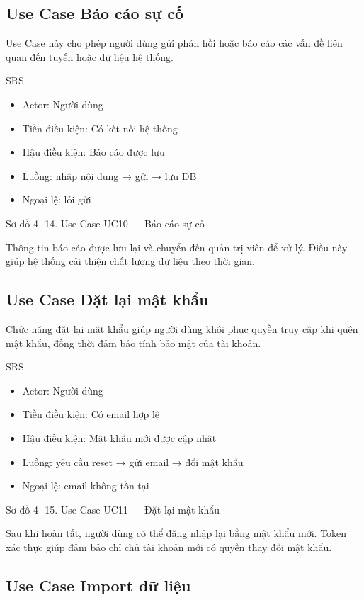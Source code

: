 \documentclass[13pt,a4paper]{report}
\begin{document}
\subsection{Use Case Báo cáo sự cố}

Use Case này cho phép người dùng gửi phản hồi hoặc báo cáo các vấn đề liên quan đến tuyến hoặc dữ liệu hệ thống.

SRS

\begin{itemize}
    \item Actor: Người dùng
    \item Tiền điều kiện: Có kết nối hệ thống
    \item Hậu điều kiện: Báo cáo được lưu
    \item Luồng: nhập nội dung → gửi → lưu DB
    \item Ngoại lệ: lỗi gửi
\end{itemize}

Sơ đồ 4- 14. Use Case UC10 — Báo cáo sự cố

Thông tin báo cáo được lưu lại và chuyển đến quản trị viên để xử lý. Điều này giúp hệ thống cải thiện chất lượng dữ liệu theo thời gian.

\subsection{Use Case Đặt lại mật khẩu}

Chức năng đặt lại mật khẩu giúp người dùng khôi phục quyền truy cập khi quên mật khẩu, đồng thời đảm bảo tính bảo mật của tài khoản.

SRS

\begin{itemize}
    \item Actor: Người dùng
    \item Tiền điều kiện: Có email hợp lệ
    \item Hậu điều kiện: Mật khẩu mới được cập nhật
    \item Luồng: yêu cầu reset → gửi email → đổi mật khẩu
    \item Ngoại lệ: email không tồn tại
\end{itemize}

Sơ đồ 4- 15. Use Case UC11 — Đặt lại mật khẩu

Sau khi hoàn tất, người dùng có thể đăng nhập lại bằng mật khẩu mới. Token xác thực giúp đảm bảo chỉ chủ tài khoản mới có quyền thay đổi mật khẩu.

\subsection{Use Case Import dữ liệu}
\end{document}
